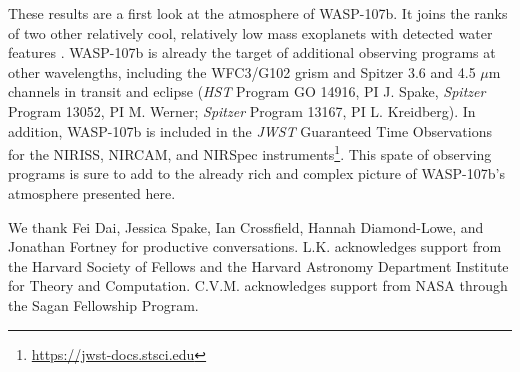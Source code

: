 \documentclass[twocolumn, trackchanges]{aastex61}
\begin{document}
These results are a first look at the atmosphere of WASP-107b. It joins the ranks of two other relatively cool, relatively low mass exoplanets with detected water features \citep[HAT-P-11b and HAT-P-26b;][]{fraine14, wakeford17}. WASP-107b is already the target of additional observing programs at other wavelengths, including the WFC3/G102 grism and Spitzer 3.6 and 4.5 $\mu$m channels in transit and eclipse (\emph{HST} Program GO 14916, PI J. Spake, \emph{Spitzer} Program 13052, PI M. Werner; \emph{Spitzer} Program 13167, PI L. Kreidberg).  In addition, WASP-107b is included in the \emph{JWST} Guaranteed Time Observations for the NIRISS, NIRCAM, and NIRSpec instruments\footnote{\url{https://jwst-docs.stsci.edu}}.  This spate of observing programs is sure to add to the already rich and complex picture of WASP-107b's atmosphere presented here. 


\acknowledgments
We thank Fei Dai, Jessica Spake, Ian Crossfield, Hannah Diamond-Lowe, and Jonathan Fortney for productive conversations. L.K. acknowledges support from the Harvard Society of Fellows and the Harvard Astronomy Department Institute for Theory and Computation. C.V.M. acknowledges support from NASA through the Sagan Fellowship Program.
\end{document}
